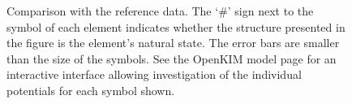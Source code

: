 \documentclass[%
 reprint,
 nofootinbib,
 amsmath,amssymb,
 aps,
]{revtex4-1}
\begin{document}
\noindent\begin{figure}
\centering
\noindent\ignorespaces
{}
\newline
{}
\newline
{}
\newline
{}
\caption{\label{fig:compare}
 Comparison with the reference data.
 The `\#' sign next to the symbol of each element indicates whether the structure presented in the figure is the element's natural state.
 The error bars are smaller than the size of the symbols.
 See the OpenKIM model page for an interactive interface allowing investigation of the individual potentials for each symbol shown.
}
\end{figure}
\end{document}
